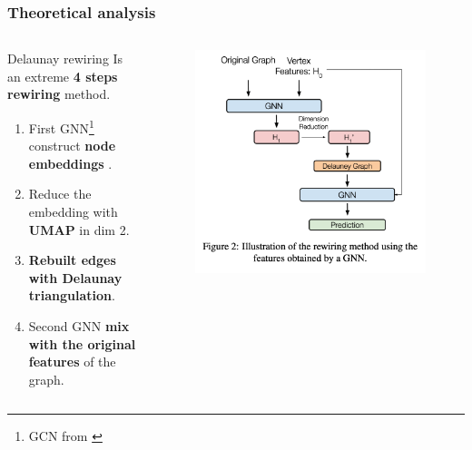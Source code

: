 \documentclass[10pt, aspectratio = 169]{beamer}
\begin{document}
\begin{frame}
    \frametitle{Theoretical analysis}
    \begin{columns}
        \begin{column}{0.6\textwidth}
        \begin{block}{Delaunay rewiring}
            Is an extreme \textbf{4 steps rewiring} method.
            \begin{enumerate}
                \item First GNN\footnote{GCN from \cite[Kipf and Welling, 2017]{kipf2017semi}} construct \textbf{node embeddings}   .
                \item Reduce the embedding with \textbf{UMAP} in dim 2.
                \item \textbf{Rebuilt edges with Delaunay triangulation}.
                \item Second GNN \textbf{mix with the original features} of the graph.
            \end{enumerate}

        \end{block}
        \end{column}
        \begin{column}{0.4\textwidth}
            \begin{figure}
                \includegraphics[width=0.99\textwidth]{figures/Rewiring_method.png}
            \end{figure}
        \end{column}
    \end{columns}
\end{frame}
\end{document}
